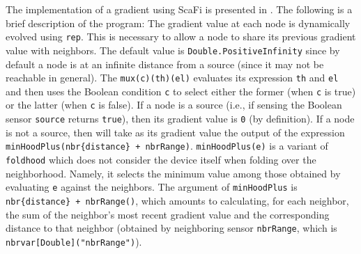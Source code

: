 The implementation of a gradient using ScaFi is presented in . The following is a brief description of the program:
The gradient value at each node is dynamically evolved using \texttt{rep}. This is necessary to allow a node to share its previous gradient value with neighbors. The default value is \texttt{Double.PositiveInfinity} since by default a node is at an infinite distance from a source (since it may not be reachable in general). The \texttt{mux(c)(th)(el)} evaluates its expression \texttt{th} and \texttt{el} and then uses the Boolean condition \texttt{c} to select either the former (when \texttt{c} is true) or the latter (when \texttt{c} is false).
If a node is a source (i.e., if sensing the Boolean sensor \texttt{source} returns \texttt{true}), then its gradient value is \texttt{0} (by definition).
If a node is not a source, then will take as its gradient value the output of the expression \texttt{minHoodPlus(nbr\{distance\} + nbrRange)}.
\texttt{minHoodPlus(e)} is a variant of \texttt{foldhood} which does not consider the device itself when folding over the neighborhood. Namely, it selects the minimum value among those obtained by evaluating \texttt{e} against the neighbors. The argument of \texttt{minHoodPlus} is \texttt{nbr\{distance\} + nbrRange()}, which amounts to calculating, for each neighbor, the sum of the neighbor's most recent gradient value and the corresponding distance to that neighbor (obtained by neighboring sensor \texttt{nbrRange}, which is \texttt{nbrvar[Double]("nbrRange")}).



